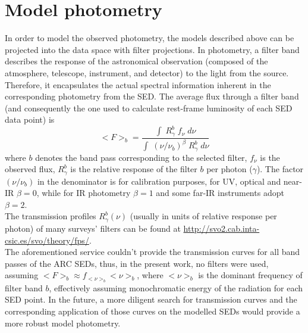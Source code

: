 
\section{Model photometry}\label{sec:filters}
In order to model the observed photometry, the models described above can be projected into the data space with filter projections. 
In photometry, a filter band describes the response of the astronomical observation (composed of the atmosphere, telescope, instrument, and detector) to the light from the source. Therefore, it encapsulates the actual spectral information inherent in the corresponding photometry from the SED.
The average flux through a filter band (and consequently the one used to calculate rest-frame luminosity of each SED data point) is
\begin{equation}
    <F>_b = \dfrac{ \int \; R_\gamma^b\; f_\nu \;d \nu }{\int \; (\nu/\nu_b)^\beta \; R_\gamma^b \;d \nu }
\end{equation}
where $b$ denotes the band pass corresponding to the selected filter, $f_\nu $ is the observed flux, $R_\gamma^b$ is the relative response of the filter $b$ per photon ($\gamma$). The factor $(\nu/\nu_b)$ in the denominator is for calibration purposes, for UV, optical and near-IR $\beta = 0$, while for IR photometry $\beta = 1$ and some far-IR instruments adopt $\beta = 2$.\\
The transmission profiles $R_\gamma^b (\nu)$ (usually in units of relative response per photon) of many surveys' filters can be found at \url{http://svo2.cab.inta-csic.es/svo/theory/fps/}.\\
The aforementioned service couldn't provide the transmission curves for all band passes of the ARC SEDs, thus, in the present work, no filters were used, assuming  $<F>_b \approx f_{<\nu>_b} <\nu>_b$, where $<\nu>_b$ is the dominant frequency of filter band $b$, effectively assuming monochromatic energy of the radiation for each SED point. In the future, a more diligent search for transmission curves and the corresponding application of those curves on the modelled SEDs would provide a more robust model photometry.   




